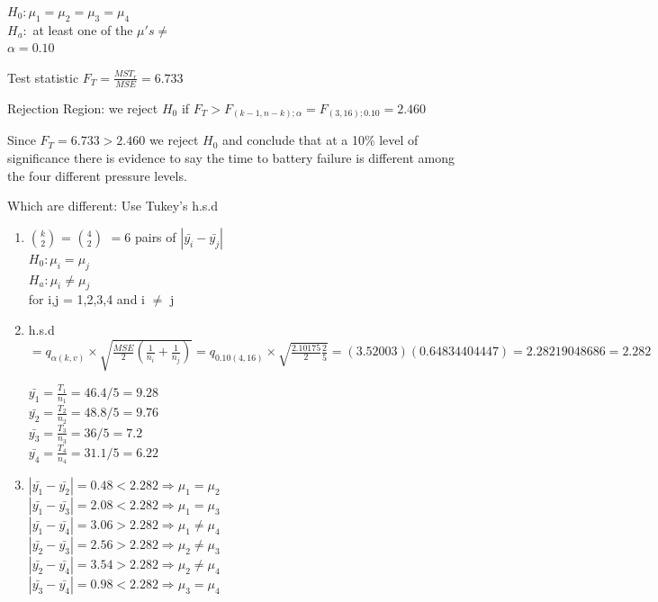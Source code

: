 \documentclass{article}
\begin{document}
\begin{enumerate}[1.]
$H_0: \mu_1 = \mu_2 = \mu_3 = \mu_4$ \\
$H_a:$ at least one of the $\mu's \neq$ \\
$\alpha = 0.10$

Test statistic $F_T = \frac{MST_r}{MSE} = 6.733$

Rejection Region: we reject $H_0$ if $F_T > F_{(k-1, n-k);\alpha} = F_{(3, 16);0.10} = 2.460$

Since $F_T = 6.733 > 2.460$ we reject $H_0$ and conclude that at a 10\% level of significance there is evidence to say the time to battery failure is different among the four different pressure levels.

Which are different: Use Tukey's h.s.d

\begin{enumerate}[1)]

\item $k \choose 2 $ = $4 \choose 2$ $= 6$ pairs of $|\bar{y_i} - \bar{y_j}|$ \\
$H_0: \mu_i = \mu_j$ \\
$H_a: \mu_i \neq \mu_j$ \\
for i,j = 1,2,3,4 and i $\neq$ j

\item h.s.d $ = q_{\alpha(k ,v)} \times \sqrt{ \frac{MSE}{2}( \frac{1}{n_i} + \frac{1}{n_j}) } = q_{0.10(4, 16)} \times \sqrt{ \frac{2.10175}{2}\frac{2}{5}} = (3.52003)(0.64834404447) = 2.28219048686 = 2.282 $

$\bar{y_1} = \frac{T_1}{n_1} = 46.4/5 = 9.28$\\
$\bar{y_2} = \frac{T_2}{n_2} = 48.8/5 = 9.76$\\
$\bar{y_3} = \frac{T_3}{n_3} = 36/5 = 7.2$\\
$\bar{y_4} = \frac{T_4}{n_4} = 31.1/5 = 6.22$\\

\item $| \bar{y_1} - \bar{y_2} | = 0.48 < 2.282 \Rightarrow \mu_1 = \mu_2$ \\
$| \bar{y_1} - \bar{y_3} | = 2.08 < 2.282 \Rightarrow \mu_1 = \mu_3$ \\
$| \bar{y_1} - \bar{y_4} | = 3.06 > 2.282 \Rightarrow \mu_1 \neq \mu_4$ \\
$| \bar{y_2} - \bar{y_3} | = 2.56 > 2.282 \Rightarrow \mu_2 \neq \mu_3$ \\
$| \bar{y_2} - \bar{y_4} | = 3.54 > 2.282 \Rightarrow \mu_2 \neq \mu_4$ \\
$| \bar{y_3} - \bar{y_4} | = 0.98 < 2.282 \Rightarrow \mu_3 = \mu_4$ \\


\end{enumerate}
\end{enumerate}
\end{document}
